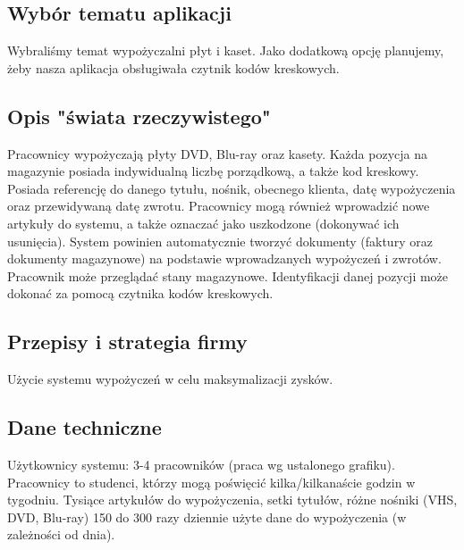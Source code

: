 \documentclass{article}
\begin{document}
\subsection{Wybór tematu aplikacji}
Wybraliśmy temat wypożyczalni płyt i kaset. Jako dodatkową opcję planujemy, żeby nasza aplikacja obsługiwała czytnik kodów kreskowych.

\subsection{Opis "świata rzeczywistego"}
Pracownicy wypożyczają płyty DVD, Blu-ray oraz kasety. Każda pozycja na magazynie posiada indywidualną liczbę porządkową, a także kod kreskowy. Posiada referencję do danego tytułu, nośnik, obecnego klienta, datę wypożyczenia oraz przewidywaną datę zwrotu. Pracownicy mogą również wprowadzić nowe artykuły do systemu, a także oznaczać jako uszkodzone (dokonywać ich usunięcia). System powinien automatycznie tworzyć dokumenty (faktury oraz dokumenty magazynowe) na podstawie wprowadzanych wypożyczeń i zwrotów. Pracownik może przeglądać stany magazynowe. Identyfikacji danej pozycji może dokonać za pomocą czytnika kodów kreskowych.

\subsection{Przepisy i strategia firmy}
Użycie systemu wypożyczeń w celu maksymalizacji zysków.

\subsection{Dane techniczne}
Użytkownicy systemu: 3-4 pracowników (praca wg ustalonego grafiku).
Pracownicy to studenci, którzy mogą poświęcić kilka/kilkanaście godzin w tygodniu. 
Tysiące artykułów do wypożyczenia, setki tytułów, różne nośniki (VHS, DVD, Blu-ray)
150 do 300 razy dziennie użyte dane do wypożyczenia (w zależności od dnia).
\end{document}
